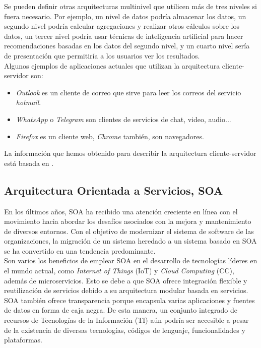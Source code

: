 Se pueden definir otras arquitecturas multinivel que utilicen más de tres niveles si fuera necesario. Por ejemplo, un nivel de datos podría almacenar los datos, un segundo nivel podría calcular agregaciones y realizar otros cálculos sobre los datos, un tercer nivel podría usar técnicas de inteligencia artificial para hacer recomendaciones basadas en los datos del segundo nivel, y un cuarto nivel sería de presentación que permitiría a los usuarios ver los resultados.\\

Algunos ejemplos de aplicaciones actuales que utilizan la arquitectura cliente-servidor son:
\begin{itemize}
	\item \textit{Outlook} es un cliente de correo que sirve para leer los correos del servicio \textit{hotmail}.
	\item \textit{WhatsApp} o \textit{Telegram} son clientes de servicios de chat, video, audio...
	\item \textit{Firefox} es un cliente web, \textit{Chrome} también, son navegadores.
\end{itemize}

La información que hemos obtenido para describir la arquitectura cliente-servidor está basada en \cite{stephens2015beginning}.
\subsection{Arquitectura Orientada a Servicios, SOA}
En los últimos años, SOA ha recibido una atención creciente en línea con el movimiento hacia abordar los desafíos asociados con la mejora y mantenimiento de diversos entornos. Con el objetivo de modernizar el sistema de software de las organizaciones, la migración de un sistema heredado a un sistema basado en SOA se ha convertido en una tendencia predominante. \\
Son varios los beneficios de emplear SOA en el desarrollo de tecnologías líderes en el mundo actual, como \textit{Internet of Things} (IoT) y \textit{Cloud Computing} (CC), además de microservicios. Esto se debe a que SOA ofrece integración flexible y reutilización de servicios debido a su arquitectura modular basada en servicios. SOA también ofrece transparencia porque encapsula varias aplicaciones y fuentes de datos en forma de caja negra. De esta manera, un conjunto integrado de recursos de Tecnologías de la Información (TI) aún podría ser accesible a pesar de la existencia de diversas tecnologías, códigos de lenguaje, funcionalidades y plataformas.

